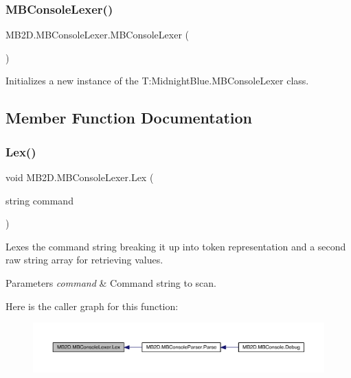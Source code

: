 \subsubsection{\texorpdfstring{M\+B\+Console\+Lexer()}{MBConsoleLexer()}}
{\footnotesize\ttfamily M\+B2\+D.\+M\+B\+Console\+Lexer.\+M\+B\+Console\+Lexer (\begin{DoxyParamCaption}{ }\end{DoxyParamCaption})\hspace{0.3cm}{\ttfamily [inline]}}



Initializes a new instance of the T\+:\+Midnight\+Blue.\+M\+B\+Console\+Lexer class. 



\subsection{Member Function Documentation}
\hypertarget{class_m_b2_d_1_1_m_b_console_lexer_a6c09fcdb1a36eff50201b9f5469bd55c}{}\label{class_m_b2_d_1_1_m_b_console_lexer_a6c09fcdb1a36eff50201b9f5469bd55c} 
\subsubsection{\texorpdfstring{Lex()}{Lex()}}
{\footnotesize\ttfamily void M\+B2\+D.\+M\+B\+Console\+Lexer.\+Lex (\begin{DoxyParamCaption}\item[{string}]{command }\end{DoxyParamCaption})\hspace{0.3cm}{\ttfamily [inline]}}



Lexes the command string breaking it up into token representation and a second raw string array for retrieving values. 


\begin{DoxyParams}{Parameters}
{\em command} & Command string to scan.\\
\hline
\end{DoxyParams}
Here is the caller graph for this function\+:
\nopagebreak
\begin{figure}[H]
\begin{center}
\leavevmode
\includegraphics[width=350pt]{class_m_b2_d_1_1_m_b_console_lexer_a6c09fcdb1a36eff50201b9f5469bd55c_icgraph}
\end{center}
\end{figure}
\hypertarget{class_m_b2_d_1_1_m_b_console_lexer_ab083ced0d68a7f7278fbb462a9c60410}{}\label{class_m_b2_d_1_1_m_b_console_lexer_ab083ced0d68a7f7278fbb462a9c60410} 
